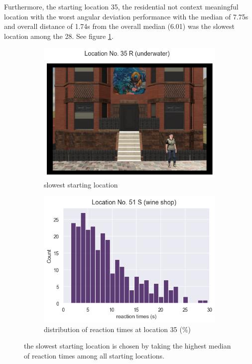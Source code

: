 Furthermore, the starting location 35, the residential not context meaningful location with the worst angular deviation performance with the median of 7.75s and overall distance of 1.74s from the overall median (6.01) was the slowest location among the 28. See figure \ref{fig:slowest_loc}.

\begin{figure}[!htb]
	\begin{subfigure}[b]{0.48\linewidth}
		\includegraphics[width=\linewidth]{figures/worst_loc_angular_error__withHA_23.png}
		\caption{slowest starting location}
		\label{fig:slowest_loc}
	\end{subfigure}
	\begin{subfigure}[b]{0.48\linewidth}
		\includegraphics[width=\linewidth]{figures/slowest_loc_RT_dist_35_23.png}
		\caption{distribution of reaction times at location 35 (\%)}
		\label{fig:best_angular_dist_35}
	\end{subfigure}
	
	\caption[Slowest starting location]{the slowest starting location is chosen by taking the highest median of reaction times among all starting locations.}
\end{figure}
\label{fig:slowest_location}

